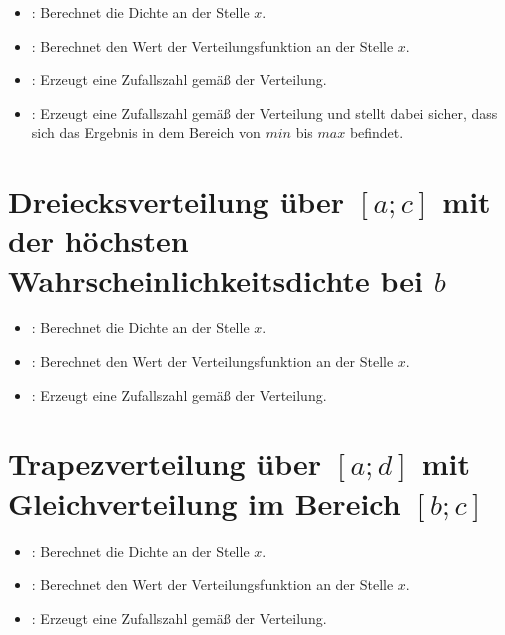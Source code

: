 \begin{itemize}

\item
{}:
Berechnet die Dichte an der Stelle $x$.

\item
{}:
Berechnet den Wert der Verteilungsfunktion an der Stelle $x$.

\item
{}:
Erzeugt eine Zufallszahl gemäß der Verteilung.  

\item
{}:
Erzeugt eine Zufallszahl gemäß der Verteilung und stellt dabei sicher, dass sich das Ergebnis in dem Bereich von $min$ bis $max$ befindet.

\end{itemize}



\section{Dreiecksverteilung über \texorpdfstring{$[a;c]$}{[a;c]} mit der höchsten Wahrscheinlichkeitsdichte bei \texorpdfstring{$b$}{b}}

\begin{itemize}

\item
{}:
Berechnet die Dichte an der Stelle $x$.

\item
{}:
Berechnet den Wert der Verteilungsfunktion an der Stelle $x$.

\item
{}:
Erzeugt eine Zufallszahl gemäß der Verteilung.

\end{itemize}



\section{Trapezverteilung über \texorpdfstring{$[a;d]$}{[a;d]} mit Gleichverteilung im Bereich \texorpdfstring{$[b;c]$}{[b;c]}}

\begin{itemize}

\item
{}:
Berechnet die Dichte an der Stelle $x$.

\item
{}:
Berechnet den Wert der Verteilungsfunktion an der Stelle $x$.

\item
{}:
Erzeugt eine Zufallszahl gemäß der Verteilung.

\end{itemize}



